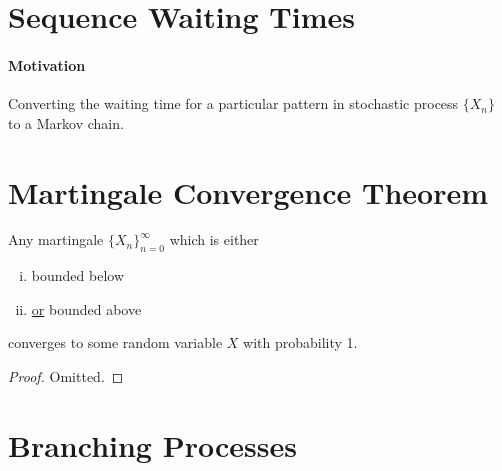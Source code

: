 \documentclass{article}
\begin{document}
	\section{Sequence Waiting Times}
	\paragraph{Motivation} Converting the waiting time for a particular pattern in stochastic process $\{X_n\}$ to a Markov chain.
	
	\section{Martingale Convergence Theorem}
	\begin{theorem}
		Any martingale $\{X_n\}_{n=0}^\infty$ which is either
		\begin{enumerate}[(i)]
			\item bounded below
			\item \ul{or} bounded above
		\end{enumerate}
		converges to some random variable $X$ with probability 1.
	\end{theorem}
	
	\begin{proof}
		Omitted.
	\end{proof}
	
	\section{Branching Processes}
\end{document}
